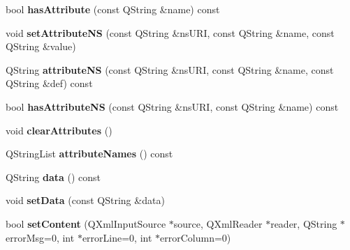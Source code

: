 \begin{DoxyCompactItemize}
\item 
\hypertarget{classKoXmlNodeData_a6c306fcb5193877bf59725fb29e4e43e}{
bool {\bfseries hasAttribute} (const QString \&name) const }
\label{classKoXmlNodeData_a6c306fcb5193877bf59725fb29e4e43e}

\item 
\hypertarget{classKoXmlNodeData_a0b2d9c0821fa76b3c01995130e5ce592}{
void {\bfseries setAttributeNS} (const QString \&nsURI, const QString \&name, const QString \&value)}
\label{classKoXmlNodeData_a0b2d9c0821fa76b3c01995130e5ce592}

\item 
\hypertarget{classKoXmlNodeData_a3f8beed542871f7b608e4ae5567e76ea}{
QString {\bfseries attributeNS} (const QString \&nsURI, const QString \&name, const QString \&def) const }
\label{classKoXmlNodeData_a3f8beed542871f7b608e4ae5567e76ea}

\item 
\hypertarget{classKoXmlNodeData_a2b193d30ba1a89808b869a2bc0a12e59}{
bool {\bfseries hasAttributeNS} (const QString \&nsURI, const QString \&name) const }
\label{classKoXmlNodeData_a2b193d30ba1a89808b869a2bc0a12e59}

\item 
\hypertarget{classKoXmlNodeData_a6445d8a23f256f57311ebc420aeca0ac}{
void {\bfseries clearAttributes} ()}
\label{classKoXmlNodeData_a6445d8a23f256f57311ebc420aeca0ac}

\item 
\hypertarget{classKoXmlNodeData_ac80d95ae852eae968828e6c9dcbc07fa}{
QStringList {\bfseries attributeNames} () const }
\label{classKoXmlNodeData_ac80d95ae852eae968828e6c9dcbc07fa}

\item 
\hypertarget{classKoXmlNodeData_a3d1cbc83524f39876e5aeeb1ebe56497}{
QString {\bfseries data} () const }
\label{classKoXmlNodeData_a3d1cbc83524f39876e5aeeb1ebe56497}

\item 
\hypertarget{classKoXmlNodeData_a5fd3031243d46e6d8797622683a52198}{
void {\bfseries setData} (const QString \&data)}
\label{classKoXmlNodeData_a5fd3031243d46e6d8797622683a52198}

\item 
\hypertarget{classKoXmlNodeData_ab7b1109a8f3355b3cdc3210396c70cfa}{
bool {\bfseries setContent} (QXmlInputSource $\ast$source, QXmlReader $\ast$reader, QString $\ast$errorMsg=0, int $\ast$errorLine=0, int $\ast$errorColumn=0)}
\label{classKoXmlNodeData_ab7b1109a8f3355b3cdc3210396c70cfa}


\end{DoxyCompactItemize}
